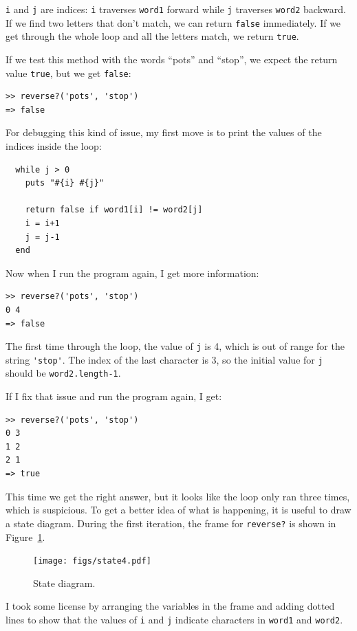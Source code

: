 \documentclass[10pt]{book}
\begin{document}
{\tt i} and {\tt j} are indices: {\tt i} traverses {\tt word1}
forward while {\tt j} traverses {\tt word2} backward.  If we find
two letters that don't match, we can return {\tt false} immediately.
If we get through the whole loop and all the letters match, we
return {\tt true}.

If we test this method with the words ``pots'' and ``stop'', we
expect the return value {\tt true}, but we get {\tt false}:

\begin{verbatim}
>> reverse?('pots', 'stop')
=> false
\end{verbatim}
%
For debugging this kind of issue, my first move is to
print the values of the indices inside the loop:

\begin{verbatim}
  while j > 0
    puts "#{i} #{j}"

    return false if word1[i] != word2[j]
    i = i+1
    j = j-1
  end
\end{verbatim}
%
Now when I run the program again, I get more information:

\begin{verbatim}
>> reverse?('pots', 'stop')
0 4
=> false
\end{verbatim}
%
The first time through the loop, the value of {\tt j} is 4,
which is out of range for the string \verb"'stop'".
The index of the last character is 3, so the
initial value for {\tt j} should be {\tt word2.length-1}.

If I fix that issue and run the program again, I get:

\begin{verbatim}
>> reverse?('pots', 'stop')
0 3
1 2
2 1
=> true
\end{verbatim}
%
This time we get the right answer, but it looks like the loop only ran
three times, which is suspicious.  To get a better idea of what is
happening, it is useful to draw a state diagram.  During the first
iteration, the frame for \verb"reverse?" is shown in
Figure~\ref{fig.state4}.

\begin{figure}
\centerline
{\texttt{[image: figs/state4.pdf]}}
\caption{State diagram.}
\label{fig.state4}
\end{figure}

I took some license by arranging the variables in the frame
and adding dotted lines to show that the values of {\tt i} and
{\tt j} indicate characters in {\tt word1} and {\tt word2}.
\end{document}
